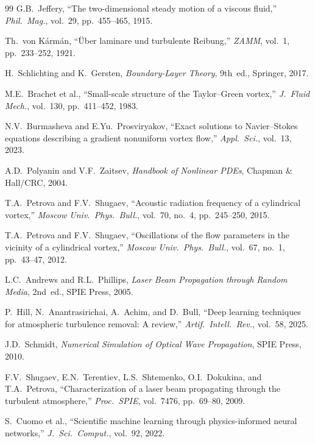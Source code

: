 \documentclass[conference]{IEEEtran}
\begin{document}
\begin{thebibliography}{99}
G.B.~Jeffery, ``The two-dimensional steady motion of a viscous fluid,'' \emph{Phil.\ Mag.}, vol.~29, pp.~455--465, 1915.

Th.~von K\'arm\'an, ``\"Uber laminare und turbulente Reibung,'' \emph{ZAMM}, vol.~1, pp.~233--252, 1921.

H.~Schlichting and K.~Gersten, \emph{Boundary-Layer Theory}, 9th~ed., Springer, 2017.

M.E.~Brachet et al., ``Small-scale structure of the Taylor--Green vortex,'' \emph{J.~Fluid Mech.}, vol.~130, pp.~411--452, 1983.

N.V.~Burmasheva and E.Yu.~Prosviryakov, ``Exact solutions to Navier--Stokes equations describing a gradient nonuniform vortex flow,'' \emph{Appl.\ Sci.}, vol.~13, 2023.

A.D.~Polyanin and V.F.~Zaitsev, \emph{Handbook of Nonlinear PDEs}, Chapman \& Hall/CRC, 2004.

T.A.~Petrova and F.V.~Shugaev, ``Acoustic radiation frequency of a cylindrical vortex,'' \emph{Moscow Univ.\ Phys.\ Bull.}, vol.~70, no.~4, pp.~245--250, 2015.

T.A.~Petrova and F.V.~Shugaev, ``Oscillations of the flow parameters in the vicinity of a cylindrical vortex,'' \emph{Moscow Univ.\ Phys.\ Bull.}, vol.~67, no.~1, pp.~43--47, 2012.

L.C.~Andrews and R.L.~Phillips, \emph{Laser Beam Propagation through Random Media}, 2nd~ed., SPIE Press, 2005.

P.~Hill, N.~Anantrasirichai, A.~Achim, and D.~Bull, ``Deep learning techniques for atmospheric turbulence removal: A review,'' \emph{Artif.\ Intell.\ Rev.}, vol.~58, 2025.

J.D.~Schmidt, \emph{Numerical Simulation of Optical Wave Propagation}, SPIE Press, 2010.

F.V.~Shugaev, E.N.~Terentiev, L.S.~Shtemenko, O.I.~Dokukina, and T.A.~Petrova, ``Characterization of a laser beam propagating through the turbulent atmosphere,'' \emph{Proc.\ SPIE}, vol.~7476, pp.~69--80, 2009.

S.~Cuomo et al., ``Scientific machine learning through physics-informed neural networks,'' \emph{J.\ Sci.\ Comput.}, vol.~92, 2022.

\end{thebibliography}
\end{document}

